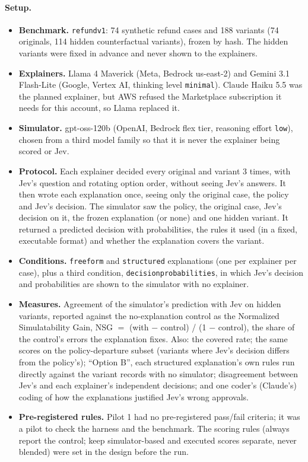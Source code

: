 \documentclass[11pt]{article}
\renewcommand{\_}{\origunderscore\allowbreak}
\begin{document}
\paragraph{Setup.}
\begin{itemize}[leftmargin=*,itemsep=1pt]
  \item \textbf{Benchmark.} \texttt{refund\_v1}: 74 synthetic refund cases and 188 variants (74 originals, 114 hidden counterfactual variants), frozen by hash. The hidden variants were fixed in advance and never shown to the explainers.
  \item \textbf{Explainers.} Llama 4 Maverick (Meta, Bedrock us-east-2) and Gemini 3.1 Flash-Lite (Google, Vertex AI, thinking level \texttt{minimal}). Claude Haiku 5.5 was the planned explainer, but AWS refused the Marketplace subscription it needs for this account, so Llama replaced it.
  \item \textbf{Simulator.} gpt-oss-120b (OpenAI, Bedrock flex tier, reasoning effort \texttt{low}), chosen from a third model family so that it is never the explainer being scored or Jev.
  \item \textbf{Protocol.} Each explainer decided every original and variant 3 times, with Jev's question and rotating option order, without seeing Jev's answers. It then wrote each explanation once, seeing only the original case, the policy and Jev's decision. The simulator saw the policy, the original case, Jev's decision on it, the frozen explanation (or none) and one hidden variant. It returned a predicted decision with probabilities, the rules it used (in a fixed, executable format) and whether the explanation covers the variant.
  \item \textbf{Conditions.} \texttt{free\_form} and \texttt{structured} explanations (one per explainer per case), plus a third condition, \texttt{decision\_probabilities}, in which Jev's decision and probabilities are shown to the simulator with no explainer.
  \item \textbf{Measures.} Agreement of the simulator's prediction with Jev on hidden variants, reported against the no-explanation control as the Normalized Simulatability Gain, NSG $=$ (with $-$ control) / (1 $-$ control), the share of the control's errors the explanation fixes. Also: the covered rate; the same scores on the policy-departure subset (variants where Jev's decision differs from the policy's); ``Option B'', each structured explanation's own rules run directly against the variant records with no simulator; disagreement between Jev's and each explainer's independent decisions; and one coder's (Claude's) coding of how the explanations justified Jev's wrong approvals.
  \item \textbf{Pre-registered rules.} Pilot 1 had no pre-registered pass/fail criteria; it was a pilot to check the harness and the benchmark. The scoring rules (always report the control; keep simulator-based and executed scores separate, never blended) were set in the design before the run.
\end{itemize}
\end{document}
